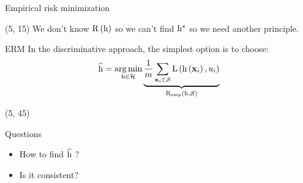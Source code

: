 \begin{frame}{\acl{Empirical risk minimization}}
  \begin{textblock}{90}(5, 15)
    We don't know $\mathrm{R} \left ( {\mathrm{h}} \right )$ so we can't find $\mathrm{h}^{\star}$ so we need
    another principle.

    \begin{block}{\acf{ERM}}
      In the discriminative approach, the simplest option is to choose:
      \[
        \widehat{\mathrm{h}} = \operatorname*{arg\,min}_{\mathrm{h} \in \mathcal{H}} \underbrace{\frac{1}{m} \sum_{\mathbf{x}_i \in \mathcal{S}} \mathrm{L} \left ( {
            \mathrm{h} \left ( {\mathbf{x}_i} \right ), u_i
          } \right )
        }_{\mathrm{R_{emp}} \left ( {\mathrm{h}, \mathcal{S}} \right )}
      \]
    \end{block}
\end{textblock}

  \begin{textblock}{90}(5, 45)
    \begin{block}{Questions}
      \begin{itemize}
      \item How to find $\widehat{\mathrm{h}}$ ?
      \item Is it consistent?
      \end{itemize}
    \end{block}
  \end{textblock}
\end{frame}


